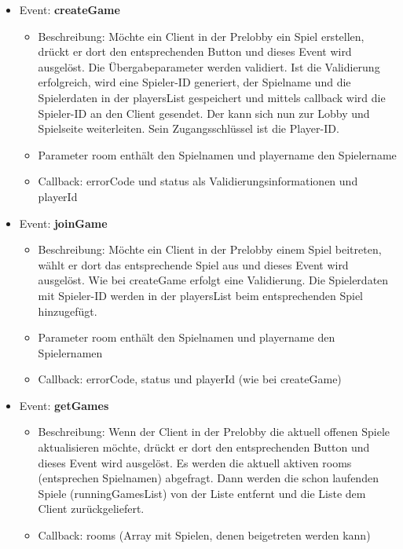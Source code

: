\documentclass[conference]{IEEEtran}
\begin{document}
\begin{itemize}

\item Event: \textbf{createGame}
\begin{itemize}
\item Beschreibung: Möchte ein Client in der Prelobby ein Spiel erstellen, drückt er dort den entsprechenden Button und dieses Event wird ausgelöst. Die Übergabeparameter werden validiert. Ist die Validierung erfolgreich, wird eine Spieler-ID generiert, der Spielname und die Spielerdaten in der playersList gespeichert und mittels callback wird die Spieler-ID an den Client gesendet. Der kann sich nun zur Lobby und Spielseite weiterleiten. Sein Zugangsschlüssel ist die Player-ID.
\item Parameter \glqq room\grqq{} enthält den Spielnamen und \glqq playername\grqq{} den Spielername
\item Callback: \glqq errorCode\grqq{} und \glqq status\grqq{} als Validierungsinformationen und \glqq playerId\grqq{}
\end{itemize}

\item Event: \textbf{joinGame}
\begin{itemize}
\item Beschreibung: Möchte ein Client in der Prelobby einem Spiel beitreten, wählt er dort das entsprechende Spiel aus und dieses Event wird ausgelöst. Wie bei createGame erfolgt eine Validierung. Die Spielerdaten mit Spieler-ID werden in der playersList beim entsprechenden Spiel hinzugefügt.
\item Parameter \glqq room\grqq{} enthält den Spielnamen und \glqq playername\grqq{} den Spielernamen
\item Callback: \glqq errorCode\grqq{}, \glqq status\grqq{} und \glqq playerId\grqq{} (wie bei createGame)
\end{itemize}

\item Event: \textbf{getGames}
\begin{itemize}
\item Beschreibung: Wenn der Client in der Prelobby die aktuell offenen Spiele aktualisieren möchte, drückt er dort den entsprechenden Button und dieses Event wird ausgelöst. Es werden die aktuell aktiven rooms (entsprechen Spielnamen) abgefragt. Dann werden die schon laufenden Spiele (runningGamesList) von der Liste entfernt und die Liste dem Client zurückgeliefert.
\item Callback: \glqq rooms\grqq{} (Array mit Spielen, denen beigetreten werden kann)
\end{itemize}


\end{itemize}
\end{document}
